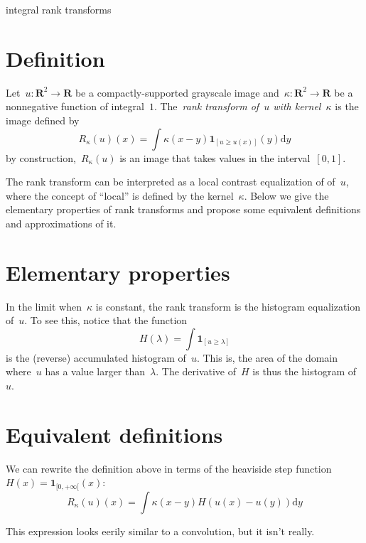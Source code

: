 \documentclass[12pt]{article}                  %
\begin{document}
\begin{center}
    \Huge integral rank transforms
\end{center}


\bigskip

\section{Definition}

Let~$u:\mathbf{R}^2\to\mathbf{R}$ be a compactly-supported grayscale image
and~$\kappa:\mathbf{R}^2\to\mathbf{R}$ be a nonnegative function of
integral~$1$.  The~\emph{rank transform of~$u$ with kernel~$\kappa$} is the
image defined by
\begin{equation}
R_{\kappa}(u)(x) = \int\kappa(x-y)\mathbf{1}_{\left[u\ge u(x)\right]}(y)\mathrm{d}y
\end{equation}
by construction,~$R_\kappa(u)$ is an image that takes values in the
interval~$[0,1]$.

The rank transform can be interpreted as a local contrast equalization of
of~$u$, where the concept of ``local'' is defined by the kernel~$\kappa$.
Below we give the elementary properties of rank transforms and propose some
equivalent definitions and approximations of it.

\section{Elementary properties}

In the limit when~$\kappa$ is constant, the rank transform is the histogram
equalization of~$u$.  To see this, notice that the function
\[
H(\lambda) = \int\mathbf{1}_{[u\ge\lambda]}
\]
is the (reverse) accumulated histogram of~$u$.  This is, the area of the domain
where~$u$ has a value larger than~$\lambda$.  The derivative of~$H$ is thus the
histogram of~$u$.

\section{Equivalent definitions}

We can rewrite the definition above in terms of the heaviside step
function~$H(x)=\mathbf{1}_{[0,+\infty[}(x)$:
\begin{equation}
R_\kappa(u)(x)=
\int
\kappa(x-y)
H\left(u\left(x\right)-u\left(y\right)\right)
\mathrm{d} y
\end{equation}

This expression looks eerily similar to a convolution, but it isn't really.
\end{document}
